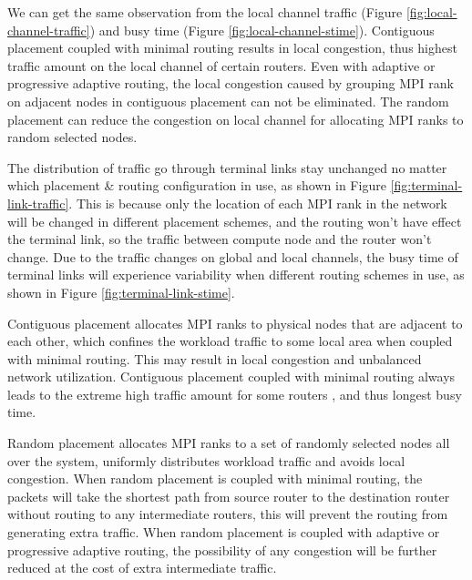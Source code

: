 \documentclass[conference,compsoc]{IEEEtran}
\newcommand{\NOTE}[1]{\hl {NOTE: #1}}
\begin{document}

We can get the same observation from the local channel traffic (Figure \ref{fig:local-channel-traffic}) and busy time (Figure \ref{fig:local-channel-stime}). Contiguous placement coupled with minimal routing results in local congestion, thus highest traffic amount on the local channel of certain routers. Even with adaptive or progressive adaptive routing, the local congestion caused by grouping MPI rank on adjacent nodes in contiguous placement can not be eliminated. The random placement can reduce the congestion on local channel for allocating MPI ranks to random selected nodes. 

The distribution of traffic go through terminal links stay unchanged no matter which placement \& routing configuration in use, as shown in Figure \ref{fig:terminal-link-traffic}. This is because only the location of each MPI rank in the network will be changed in different placement schemes, and the routing won't have effect the terminal link, so the traffic between compute node and the router won't change. Due to the traffic changes on global and local channels, the busy time of terminal links will experience variability when different routing schemes in use, as shown in Figure \ref{fig:terminal-link-stime}. 


 

Contiguous placement allocates MPI ranks to physical nodes that are adjacent to each other, which confines the workload traffic to some local area when coupled with minimal routing. This may result in local congestion and unbalanced network utilization. Contiguous placement coupled with minimal routing always leads to the extreme high traffic amount for some routers , and thus longest busy time.

Random placement allocates MPI ranks to a set of randomly selected nodes all over the system, uniformly distributes workload traffic and avoids local congestion. When random placement is coupled with minimal routing, the packets will take the shortest path from source router to the destination router without routing to any intermediate routers, this will prevent the routing from generating extra traffic. When random placement is coupled with adaptive or progressive adaptive routing, the possibility of any congestion will be further reduced at the cost of extra intermediate traffic. 
\end{document}
